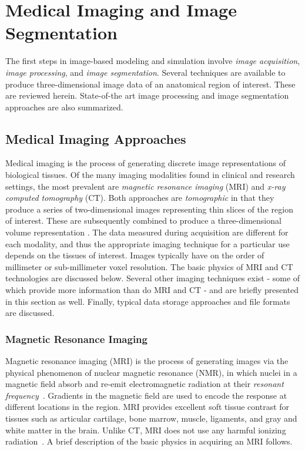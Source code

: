 \chapter{Medical Imaging and Image Segmentation}
\label{chap:2}
%

The first steps in image-based modeling and simulation involve \textit{image acquisition}, \textit{image processing}, and \textit{image segmentation}. Several techniques are available to produce three-dimensional image data of an anatomical region of interest. These are reviewed herein. State-of-the art image processing and image segmentation approaches are also summarized.

\section{Medical Imaging Approaches}
\label{Medical Imaging Approaches}

Medical imaging is the process of generating discrete image representations of biological tissues. Of the many imaging modalities found in clinical and research settings, the most prevalent are \textit{magnetic resonance imaging} (MRI) and \textit{x-ray computed tomography} (CT). Both approaches are \textit{tomographic} in that they produce a series of two-dimensional images representing thin slices of the region of interest. These are subsequently combined to produce a three-dimensional volume representation \cite{larobina_murino_2014}. The data measured during acquisition are different for each modality, and thus the appropriate imaging technique for a particular use depends on the tissues of interest. Images typically have on the order of millimeter or sub-millimeter voxel resolution. The basic physics of MRI and CT technologies are discussed below. Several other imaging techniques exist - some of which provide more information than do MRI and CT - and are briefly presented in this section as well. Finally, typical data storage approaches and file formats are discussed.

\subsection{Magnetic Resonance Imaging}
\label{Magnetic Resonance Imaging}

Magnetic resonance imaging (MRI) is the process of generating images via the physical phenomenon of nuclear magnetic resonance (NMR), in which nuclei in a magnetic field absorb and re-emit electromagnetic radiation at their \textit{resonant frequency}~\cite{NMR}. Gradients in the magnetic field are used to encode the response at different locations in the region. MRI provides excellent soft tissue contrast for tissues such as articular cartilage, bone marrow, muscle, ligaments, and gray and white matter in the brain. Unlike CT, MRI does not use any harmful ionizing radiation~\cite{waldman_campbell}. A brief description of the basic physics in acquiring an MRI follows.


